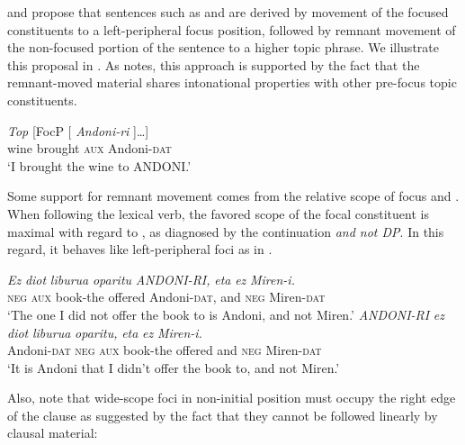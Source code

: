 \documentclass[output=paper]{langscibook}
\begin{document}
\citet{ortizdeurbina2002} and \citet{uribeetxebarria2003} propose that sentences such as  and  are derived by movement of the focused constituents to a left-peripheral focus position, followed by remnant movement of the non-focused portion of the sentence to a higher topic phrase.  We illustrate this proposal in . As \cite{ortizdeurbina2002} notes, this approach is supported by the fact that the remnant-moved material shares intonational properties with other pre-focus topic constituents.  

\ea \label{ex:haddican:43} 
\gll [TopP [ \textit{Ardoa} \textit{\st{Andoni-ri}} \textit{ekarri} \textit{diot}] \textit{Top} [FocP [ \textit{Andoni-ri} ]\ldots  ]  \\
{} {} wine {} brought \textsc{aux} {} {} {} Andoni-\textsc{dat} \\\protect\label{ardoa}
\glt `I brought the wine to ANDONI.'  
\z

Some support for remnant movement comes from the relative scope of focus and . When following the lexical verb, the favored scope of the focal constituent is maximal with regard to , as diagnosed by the continuation \textit{and not DP}. In this regard, it behaves like left-peripheral foci as in  \citep{ortizdeurbina2002}.
	
\ea	
\ea \label{ex:haddican:44a} \gll  \textit{Ez} \textit{diot} \textit{liburua} \textit{oparitu} \textit{ANDONI-RI,} \textit{eta} \textit{ez} \textit{Miren-i.}\\
\textsc{neg} \textsc{aux} book-the offered Andoni-\textsc{dat}, and \textsc{neg} Miren-\textsc{dat}\\
\glt `The one I did not offer the book to is Andoni, and not Miren.'
\ex \label{ex:haddican:44b} \gll  \textit{ANDONI-RI} \textit{ez} \textit{diot} \textit{liburua} \textit{oparitu,} \textit{eta} \textit{ez} \textit{Miren-i.}\\
Andoni-\textsc{dat} \textsc{neg} \textsc{aux} book-the offered and \textsc{neg} Miren-\textsc{dat}\\
\glt `It is Andoni that I didn't offer the book to, and not Miren.'
\z\z

Also, note that wide-scope foci in non-initial position must occupy the right edge of the clause as suggested by the fact that they cannot be followed linearly by clausal material:
\end{document}
